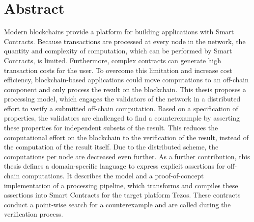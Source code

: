 \chapter*{Abstract}
Modern blockchains provide a platform for building applications with Smart Contracts. Because transactions are processed at every node in the network, the quantity and complexity of computation, which can be performed by Smart Contracts, is limited. Furthermore, complex contracts can generate high transaction costs for the user. To overcome this limitation and increase cost efficiency, blockchain-based applications could move computations to an off-chain component and only process the result on the blockchain.
This thesis proposes a processing model, which engages the validators of the network in a distributed effort to verify a submitted off-chain computation. Based on a specification of properties, the validators are challenged to find a counterexample by asserting these properties for independent subsets of the result. This reduces the computational effort on the blockchain to the verification of the result, instead of the computation of the result itself. Due to the distributed scheme, the computations per node are decreased even further. As a further contribution, this thesis defines a domain-specific language to express explicit assertions for off-chain computations. It describes the model and a proof-of-concept implementation of a processing pipeline, which transforms and compiles these assertions into Smart Contracts for the target platform Tezos. These contracts conduct a point-wise search for a counterexample and are called during the verification process.